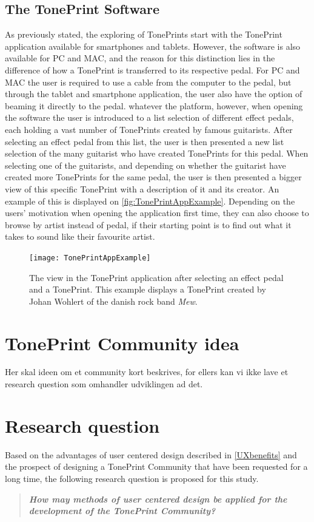 \subsection{The TonePrint Software}
\label{TonePrintSoftware}
As previously stated, the exploring of TonePrints start with the TonePrint application available for smartphones and tablets. However, the software is also available for PC and MAC, and the reason for this distinction lies in the difference of how a TonePrint is transferred to its respective pedal. For PC and MAC the user is required to use a cable from the computer to the pedal, but through the tablet and smartphone application, the user also have the option of beaming it directly to the pedal. whatever the platform, however, when opening the software the user is introduced to a list selection of different effect pedals, each holding a vast number of TonePrints created by famous guitarists. After selecting an effect pedal from this list, the user is then presented a new list selection of the many guitarist who have created TonePrints for this pedal. When selecting one of the guitarists, and depending on whether the guitarist have created more TonePrints for the same pedal, the user is then presented a bigger view of this specific TonePrint with a description of it and its creator. An example of this is displayed on \autoref{fig:TonePrintAppExample}. Depending on the users' motivation when opening the application first time, they can also choose to browse by artist instead of pedal, if their starting point is to find out what it takes to sound like their favourite artist.
%
\begin{figure}[H]
	\centering
	\texttt{[image: TonePrintAppExample]}
	\caption{The view in the TonePrint application after selecting an effect pedal and a TonePrint. This example displays a TonePrint created by Johan Wohlert of the danish rock band \textit{Mew}.}
	\label{fig:TonePrintAppExample}
\end{figure}

\section{TonePrint Community idea}
\label{CommunityIdea}
Her skal ideen om et community kort beskrives, for ellers kan vi ikke lave et research question som omhandler udviklingen ad det.
%
\section{Research question}
\label{ResearchQuestion}
%
Based on the advantages of user centered design described in \autoref{UXbenefits} and the prospect of designing a TonePrint Community that have been requested for a long time, the following research question is proposed for this study.

\begin{quote}
	\textbf{\textit{How may methods of user centered design be applied for the development of the TonePrint Community?}}
\end{quote}
